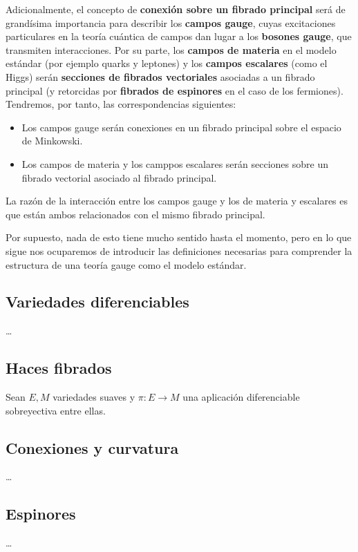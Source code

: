 \documentclass[
                egregdoesnotlikesansseriftitles,
                paper=a4,
                fontsize=13pt,
                DIV=calc]{scrarticle}
\begin{document}
Adicionalmente, el concepto de \textbf{conexión sobre un fibrado principal} será de
grandísima importancia para describir los \textbf{campos gauge}, cuyas excitaciones
particulares en la teoría cuántica de campos dan lugar a los \textbf{bosones gauge},
que transmiten interacciones. Por su parte, los \textbf{campos de materia} en el modelo
estándar (por ejemplo quarks y leptones) y los \textbf{campos escalares} (como el
Higgs) serán \textbf{secciones de fibrados vectoriales} asociadas a un fibrado
principal (y retorcidas por \textbf{fibrados de espinores} en el caso de los
fermiones). Tendremos, por tanto, las correspondencias siguientes:
\begin{itemize}
\item Los campos gauge serán conexiones en un fibrado principal sobre el espacio de
Minkowski.
\item Los campos de materia y los camppos escalares serán secciones sobre un fibrado
vectorial asociado al fibrado principal.
\end{itemize}

La razón de la interacción entre los campos gauge y los de materia y escalares
es que están ambos relacionados con el mismo fibrado principal.

Por supuesto, nada de esto tiene mucho sentido hasta el momento, pero en lo que
sigue nos ocuparemos de introducir las definiciones necesarias para comprender
la estructura de una teoría gauge como el modelo estándar.

\subsection{Variedades diferenciables}
\label{sec:orgb8aec5c}
\ldots{}

\subsection{Haces fibrados}
\label{sec:org4e569cd}
Sean \(E, M\) variedades suaves y \(\pi : E \longrightarrow M\) una aplicación
diferenciable sobreyectiva entre ellas.

\subsection{Conexiones y curvatura}
\label{sec:org9970201}
\ldots{}

\subsection{Espinores}
\label{sec:org17f7eaa}
\ldots{}
\end{document}
